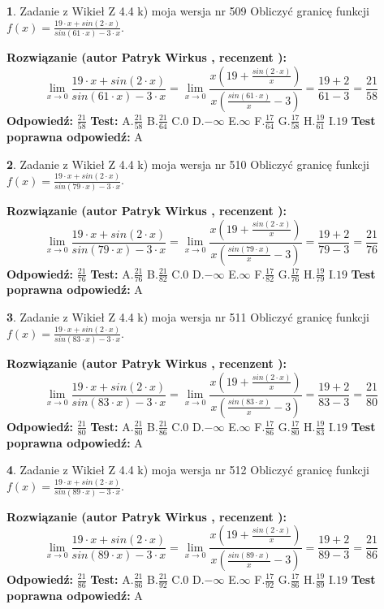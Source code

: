 \documentclass[12pt, a4paper]{article}
\theoremstyle{definition} %
\newtheorem{zad}{}
\newcommand{\zadStart}[1]{\begin{zad}#1\newline}
\newcommand{\zadStop}{\end{zad}}
\newcommand{\rozwStart}[2]{\noindent \textbf{Rozwiązanie (autor #1 , recenzent #2): }\newline}
\newcommand{\rozwStop}{\newline}
\newcommand{\odpStart}{\noindent \textbf{Odpowiedź:}\newline}
\newcommand{\odpStop}{\newline}
\newcommand{\testStart}{\noindent \textbf{Test:}\newline}
\newcommand{\testStop}{\newline}
\newcommand{\kluczStart}{\noindent \textbf{Test poprawna odpowiedź:}\newline}
\newcommand{\kluczStop}{\newline}
\begin{document}
\zadStart{Zadanie z Wikieł Z 4.4 k) moja wersja nr 509}
Obliczyć granicę funkcji $f(x)=\frac{19\cdot x +sin(2\cdot x)}{sin(61\cdot x) -3\cdot x}$.
\zadStop
\rozwStart{Patryk Wirkus}{}
$$\lim\limits_{x\to 0}\frac{19\cdot x +sin(2\cdot x)}{sin(61\cdot x) -3\cdot x}
=\lim\limits_{x\to 0}\frac{x(19+\frac{sin(2\cdot x)}{x})}{x(\frac{sin(61\cdot x)}{x}-3)}
=\frac{19+2}{61-3} = \frac{21}{58}$$
\rozwStop
\odpStart
$\frac{21}{58}$
\odpStop
\testStart
A.$\frac{21}{58}$
B.$\frac{21}{64}$
C.$0$
D.$-\infty$
E.$\infty$
F.$\frac{17}{64}$
G.$\frac{17}{58}$
H.$\frac{19}{61}$
I.$19$
\testStop
\kluczStart
A
\kluczStop



\zadStart{Zadanie z Wikieł Z 4.4 k) moja wersja nr 510}
Obliczyć granicę funkcji $f(x)=\frac{19\cdot x +sin(2\cdot x)}{sin(79\cdot x) -3\cdot x}$.
\zadStop
\rozwStart{Patryk Wirkus}{}
$$\lim\limits_{x\to 0}\frac{19\cdot x +sin(2\cdot x)}{sin(79\cdot x) -3\cdot x}
=\lim\limits_{x\to 0}\frac{x(19+\frac{sin(2\cdot x)}{x})}{x(\frac{sin(79\cdot x)}{x}-3)}
=\frac{19+2}{79-3} = \frac{21}{76}$$
\rozwStop
\odpStart
$\frac{21}{76}$
\odpStop
\testStart
A.$\frac{21}{76}$
B.$\frac{21}{82}$
C.$0$
D.$-\infty$
E.$\infty$
F.$\frac{17}{82}$
G.$\frac{17}{76}$
H.$\frac{19}{79}$
I.$19$
\testStop
\kluczStart
A
\kluczStop



\zadStart{Zadanie z Wikieł Z 4.4 k) moja wersja nr 511}
Obliczyć granicę funkcji $f(x)=\frac{19\cdot x +sin(2\cdot x)}{sin(83\cdot x) -3\cdot x}$.
\zadStop
\rozwStart{Patryk Wirkus}{}
$$\lim\limits_{x\to 0}\frac{19\cdot x +sin(2\cdot x)}{sin(83\cdot x) -3\cdot x}
=\lim\limits_{x\to 0}\frac{x(19+\frac{sin(2\cdot x)}{x})}{x(\frac{sin(83\cdot x)}{x}-3)}
=\frac{19+2}{83-3} = \frac{21}{80}$$
\rozwStop
\odpStart
$\frac{21}{80}$
\odpStop
\testStart
A.$\frac{21}{80}$
B.$\frac{21}{86}$
C.$0$
D.$-\infty$
E.$\infty$
F.$\frac{17}{86}$
G.$\frac{17}{80}$
H.$\frac{19}{83}$
I.$19$
\testStop
\kluczStart
A
\kluczStop



\zadStart{Zadanie z Wikieł Z 4.4 k) moja wersja nr 512}
Obliczyć granicę funkcji $f(x)=\frac{19\cdot x +sin(2\cdot x)}{sin(89\cdot x) -3\cdot x}$.
\zadStop
\rozwStart{Patryk Wirkus}{}
$$\lim\limits_{x\to 0}\frac{19\cdot x +sin(2\cdot x)}{sin(89\cdot x) -3\cdot x}
=\lim\limits_{x\to 0}\frac{x(19+\frac{sin(2\cdot x)}{x})}{x(\frac{sin(89\cdot x)}{x}-3)}
=\frac{19+2}{89-3} = \frac{21}{86}$$
\rozwStop
\odpStart
$\frac{21}{86}$
\odpStop
\testStart
A.$\frac{21}{86}$
B.$\frac{21}{92}$
C.$0$
D.$-\infty$
E.$\infty$
F.$\frac{17}{92}$
G.$\frac{17}{86}$
H.$\frac{19}{89}$
I.$19$
\testStop
\kluczStart
A
\kluczStop
\end{document}
